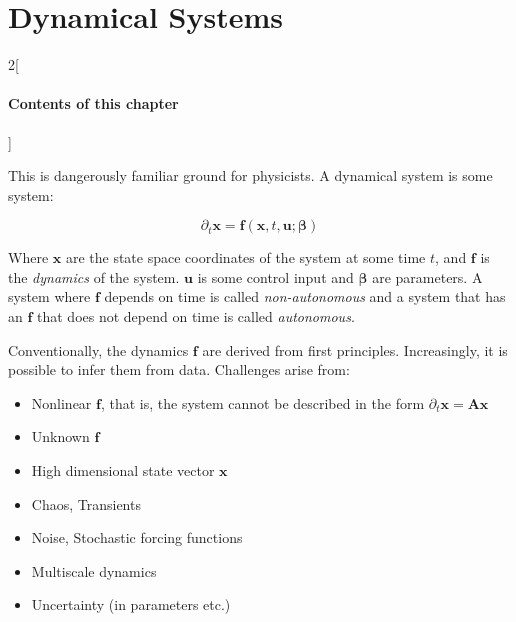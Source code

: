 \chapter{Dynamical Systems}
\label{chp:dynamicalsystems}

\begin{multicols}{2}[\subsubsection*{Contents of this chapter}]
\end{multicols}

This is dangerously familiar ground for physicists. A dynamical system is some system:

\begin{equation}
\partial_t\mathbf{x} = \mathbf{f}(\mathbf{x},t,\mathbf{u};\mathbf{\beta})
\end{equation}

Where $\mathbf{x}$ are the state space coordinates of the system at some time $t$, and $\mathbf{f}$ is the \textit{dynamics} of the system. $\mathbf{u}$ is some control input and $\mathbf{\beta}$ are parameters. A system where $\mathbf{f}$ depends on time is called \textit{non-autonomous} and a system that has an $\mathbf{f}$ that does not depend on time is called \textit{autonomous}.  

Conventionally, the dynamics $\mathbf{f}$ are derived from first principles. Increasingly, it is possible to infer them from data. Challenges arise from:

\begin{itemize}
\item Nonlinear $\mathbf{f}$, that is, the system cannot be described in the form $\partial_t\mathbf{x}=\mathbf{Ax}$
\item Unknown $\mathbf{f}$
\item High dimensional state vector $\mathbf{x}$
\item Chaos, Transients
\item Noise, Stochastic forcing functions
\item Multiscale dynamics
\item Uncertainty (in parameters etc.)
\end{itemize}

